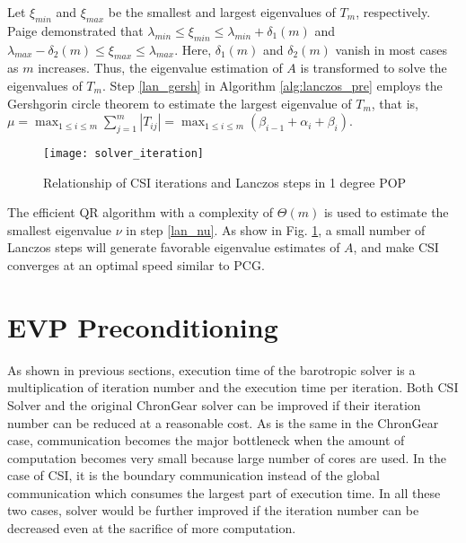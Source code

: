 \documentclass{sig-alternate}
\begin{document}
Let $\xi_{min}$ and $\xi_{max}$ be the smallest and largest eigenvalues of $T_m$, respectively. Paige\cite{Paige1980235} demonstrated that
$\lambda_{min} \le \xi_{min} \le \lambda_{min}+\delta_1(m)$ and $\lambda_{max}-\delta_2(m)  \le \xi_{max} \le \lambda_{max}$.
Here, $\delta_1(m)$ and $\delta_2(m)$ vanish in most cases as $m$ increases. Thus, the eigenvalue estimation of $A$ is transformed to solve the eigenvalues of $T_m$.
Step \ref{lan_gersh} in Algorithm  \ref{alg:lanczos_pre} employs the Gershgorin circle theorem to estimate the largest eigenvalue of $T_m$, that is,
$\mu = \max_{1 \le i \le m}\sum^m_{j=1}|T_{ij}|=\max_{1 \le i \le m}(\beta_{i-1}+\alpha_i +\beta_{i})$.
\begin {figure}
\centering
\texttt{[image: solver\_iteration]}
\caption []{Relationship of CSI iterations and Lanczos steps in 1 degree POP \label {fig:iter}}
\end {figure}

The efficient QR algorithm \cite{ortega1963llt} with a complexity of $\Theta(m)$ is used to estimate the smallest eigenvalue $\nu$ in step \ref{lan_nu}. As show in Fig. \ref{fig:iter}, a small number of Lanczos steps will generate favorable eigenvalue estimates of $A$, and make CSI converges at an optimal speed similar to PCG.




\section{EVP Preconditioning} \label{se:evp}
As shown in previous sections,  execution time of the barotropic solver is a multiplication of iteration number and the execution time per iteration. Both CSI Solver and the original ChronGear solver can be improved if their iteration number can be reduced at a reasonable cost. 
As is the same in the ChronGear case, communication becomes the major bottleneck when the amount of computation becomes very small because large number of cores are used. 
In the case of CSI, it is the boundary communication instead of the global communication which consumes the largest part of execution time. 
In all these two cases, solver would be further improved if the iteration number can be decreased even at the sacrifice of more computation. 
\end{document}
